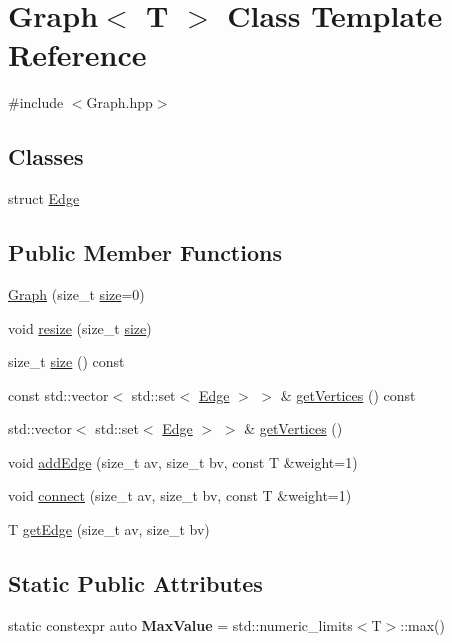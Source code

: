 \hypertarget{class_graph}{}\section{Graph$<$ T $>$ Class Template Reference}
\label{class_graph}


{\ttfamily \#include $<$Graph.\+hpp$>$}

\subsection*{Classes}
\begin{DoxyCompactItemize}
\item 
struct \hyperlink{struct_graph_1_1_edge}{Edge}
\end{DoxyCompactItemize}
\subsection*{Public Member Functions}
\begin{DoxyCompactItemize}
\item 
\hyperlink{class_graph_ae4d33378f071400af20f374d03a2ae17}{Graph} (size\+\_\+t \hyperlink{class_graph_a27cef878a072784aeca6dc1863b39ecb}{size}=0)
\item 
void \hyperlink{class_graph_a2097e3c0a42566a047e922c21ee1bb73}{resize} (size\+\_\+t \hyperlink{class_graph_a27cef878a072784aeca6dc1863b39ecb}{size})
\item 
size\+\_\+t \hyperlink{class_graph_a27cef878a072784aeca6dc1863b39ecb}{size} () const
\item 
const std\+::vector$<$ std\+::set$<$ \hyperlink{struct_graph_1_1_edge}{Edge} $>$ $>$ \& \hyperlink{class_graph_ab37935cf08ce2cafd2edac3a503010f4}{get\+Vertices} () const
\item 
std\+::vector$<$ std\+::set$<$ \hyperlink{struct_graph_1_1_edge}{Edge} $>$ $>$ \& \hyperlink{class_graph_ab7c3b45b65d2b72ced442ff01c81da60}{get\+Vertices} ()
\item 
void \hyperlink{class_graph_a8c2e51b9add82f2faa9979b24702832b}{add\+Edge} (size\+\_\+t av, size\+\_\+t bv, const T \&weight=1)
\item 
void \hyperlink{class_graph_aa029e4ed309862a13ddd3245940c57dd}{connect} (size\+\_\+t av, size\+\_\+t bv, const T \&weight=1)
\item 
T \hyperlink{class_graph_a41082f5f83e15b045539d00408d03710}{get\+Edge} (size\+\_\+t av, size\+\_\+t bv)
\end{DoxyCompactItemize}
\subsection*{Static Public Attributes}
\begin{DoxyCompactItemize}
\item 
\mbox{\label{class_graph_a9ee049f1aa0ee96183f8cc0b96371352}} 
static constexpr auto {\bfseries Max\+Value} = std\+::numeric\+\_\+limits$<$T$>$\+::max()
\end{DoxyCompactItemize}


